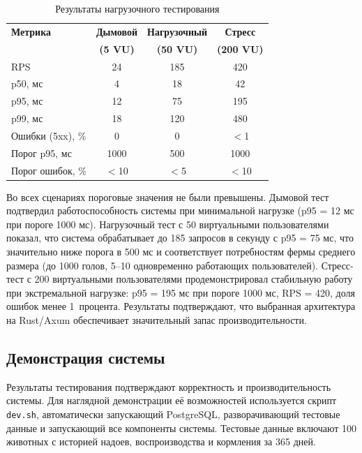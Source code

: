 \begin{table}
  \caption{Результаты нагрузочного тестирования}
  \small
  \begin{tabular}{|l|c|c|c|}
    \hline
    \textbf{Метрика} & \textbf{Дымовой} & \textbf{Нагрузочный} & \textbf{Стресс} \\
    & \textbf{(5 VU)} & \textbf{(50 VU)} & \textbf{(200 VU)} \\
    \hline
    RPS & 24 & 185 & 420 \\
    \hline
    p50, мс & 4 & 18 & 42 \\
    \hline
    p95, мс & 12 & 75 & 195 \\
    \hline
    p99, мс & 18 & 120 & 480 \\
    \hline
    Ошибки (5xx), \% & 0 & 0 & $<$1 \\
    \hline
    Порог p95, мс & 1000 & 500 & 1000 \\
    \hline
    Порог ошибок, \% & $<$10 & $<$5 & $<$10 \\
    \hline
  \end{tabular}
  \label{loadresults}
\end{table}

Во всех сценариях пороговые значения не были превышены. Дымовой тест подтвердил работоспособность системы при минимальной нагрузке (p95 = 12 мс при пороге 1000 мс). Нагрузочный тест с 50 виртуальными пользователями показал, что система обрабатывает до 185 запросов в секунду с p95 = 75 мс, что значительно ниже порога в 500 мс и соответствует потребностям фермы среднего размера (до 1000 голов, 5--10 одновременно работающих пользователей). Стресс-тест с 200 виртуальными пользователями продемонстрировал стабильную работу при экстремальной нагрузке: p95 = 195 мс при пороге 1000 мс, RPS = 420, доля ошибок менее 1~процента. Результаты подтверждают, что выбранная архитектура на Rust/Axum обеспечивает значительный запас производительности.

\subsection{Демонстрация системы}

Результаты тестирования подтверждают корректность и производительность системы. Для наглядной демонстрации её возможностей используется скрипт \texttt{dev.sh}, автоматически запускающий PostgreSQL, разворачивающий тестовые данные и запускающий все компоненты системы. Тестовые данные включают 100 животных с историей надоев, воспроизводства и кормления за 365 дней.


